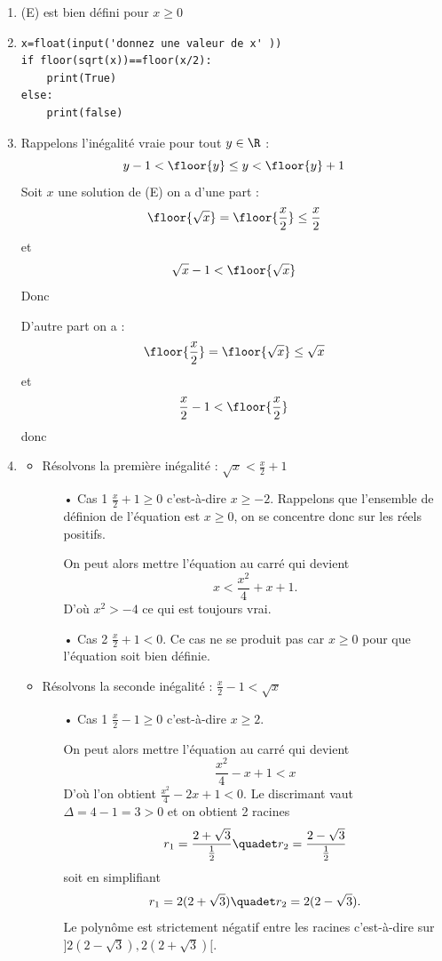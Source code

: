 \begin{correction}
\begin{enumerate}
\item (E) est bien défini pour $x\geq 0$
\item \begin{lstlisting}
x=float(input('donnez une valeur de x' ))
if floor(sqrt(x))==floor(x/2):
	print(True)
else:
	print(false)
\end{lstlisting}
\item Rappelons l'inégalité vraie pour tout $y\in \R$ :
$$y-1<\floor{y} \leq y <\floor{y}+1$$
 Soit $x$ une solution de (E) on a d'une part : 
$$\floor{\sqrt{x}}=\floor{\frac{x}{2}} \leq \frac{x}{2}$$
et 
$$\sqrt{x}-1< \floor{\sqrt{x}}$$
Donc 



D'autre part on  a : 
$$\floor{\frac{x}{2}}=\floor{\sqrt{x}}\leq \sqrt{x}$$
et $$\frac{x}{2}-1<\floor{\frac{x}{2}}$$
donc 

\item 
\begin{itemize}


\item Résolvons la première inégalité : $\sqrt{x}<\frac{x}{2}+1$

\begin{itemize}
\item[•] Cas 1 $\frac{x}{2}+1\geq 0$ c'est-à-dire $x\geq -2$. Rappelons que l'ensemble de définion de l'équation est $x\geq 0$, on se concentre donc sur les réels positifs. 

On peut alors mettre l'équation au carré qui devient 
$$x < \frac{x^2}{4} +x+1.$$
D'où $x^2>-4$ ce qui est toujours vrai. 
\item[•] Cas 2 $\frac{x}{2}+1< 0$. Ce cas ne se produit pas car $x\geq 0$ pour que l'équation soit bien définie. 
\end{itemize}


\item Résolvons la seconde inégalité : $\frac{x}{2}-1<\sqrt{x}$

\begin{itemize}
\item[•] Cas 1 $\frac{x}{2}-1\geq 0$ c'est-à-dire $x\geq 2$. 

On peut alors mettre l'équation au carré qui devient 
$$ \frac{x^2}{4} -x+1<x$$
D'où l'on obtient $\frac{x^2}{4} -2x+1<0$. 
Le discrimant vaut $\Delta =4-1=3>0$ et on obtient 2 racines 
$$r_1 = \frac{2+\sqrt{3}}{\frac{1}{2}}\quadet r_2 = \frac{2-\sqrt{3}}{\frac{1}{2}}$$
soit en simplifiant 
$$r_1 = 2(2+\sqrt{3})\quadet r_2 = 2(2-\sqrt{3}).$$
Le polynôme est strictement négatif entre les racines c'est-à-dire sur $]2(2-\sqrt{3}),2(2+\sqrt{3})[$.


\end{itemize}
\end{itemize}
\end{enumerate}
\end{correction}
